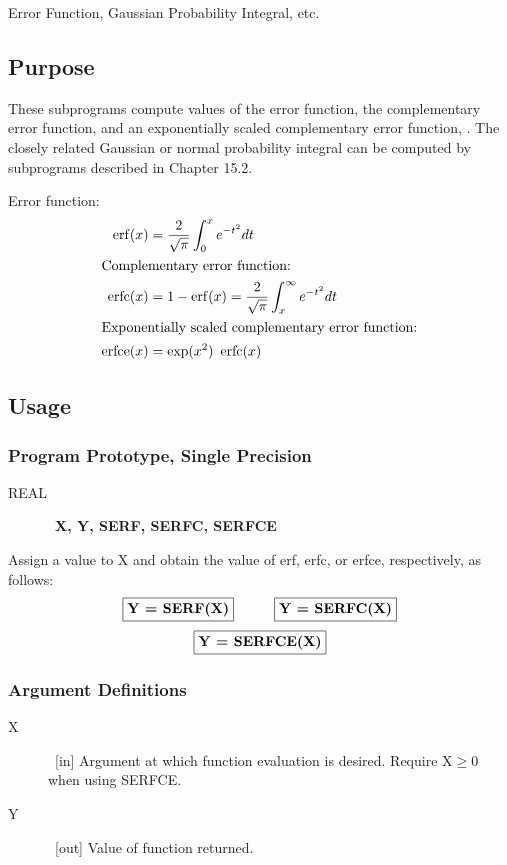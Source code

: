 \documentclass[twoside]{MATH77}
\begin{document}
 Error Function, Gaussian Probability Integral, etc.


\subsection{Purpose}

These subprograms compute values of the error function,
the complementary
error function, and an exponentially scaled complementary error
function, \cite{ams55:erf,Hart:1968:CA:erf}.  The closely related Gaussian or
normal probability integral can be computed by subprograms described in Chapter
15.2.

Error function:
\begin{align*}
\erf (x)&=\frac 2{\sqrt{\pi }}\int_0^xe^{-t^2}dt\\
\intertext{Complementary error function:}
\erfc (x)&=1-\erf (x)=\frac 2{\sqrt{\pi }}\int_x^\infty e^{-t^2}dt\\
\intertext{Exponentially scaled complementary error function:}
\erfce (x)&=\exp (x^2)\ \erfc (x)
\end{align*}
\subsection{Usage}

\subsubsection{Program Prototype, Single Precision}

\begin{description}
\item[REAL]  \ {\bf X, Y, SERF, SERFC, SERFCE}
\end{description}

Assign a value to X and obtain the value of erf, erfc, or erfce,
respectively, as follows:
$$
\fbox{{\bf Y = SERF(X)}} \hspace{.4in} \fbox{{\bf Y = SERFC(X)}}
$$
$$
\fbox{{\bf Y = SERFCE(X)}}
$$

\subsubsection{Argument Definitions}

\begin{description}
\item[X]  \ [in] Argument at which function evaluation is desired. Require
$\text{X} \geq 0$ when using SERFCE.

\item[Y]  \ [out] Value of function returned.
\end{description}
\end{document}
